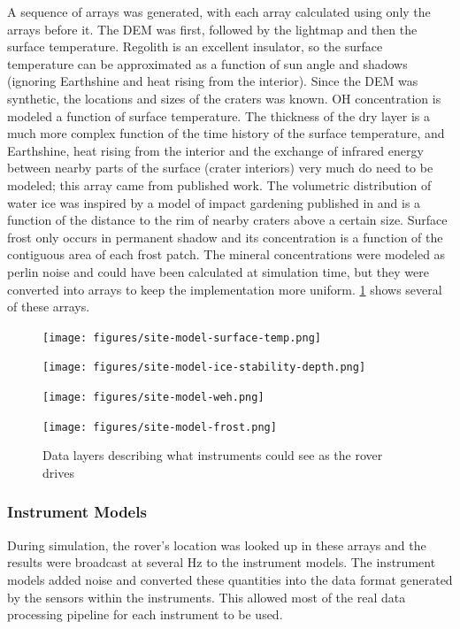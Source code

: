 \documentclass[twocolumn,letterpaper]{IEEEAerospaceCLS}  %
\begin{document}
A sequence of arrays was generated, with each array calculated using only the arrays before it.  
The DEM was first, followed by the lightmap and then the surface temperature.  
Regolith is an excellent insulator, so the surface temperature can be approximated as a function of sun angle and shadows (ignoring Earthshine and heat rising from the interior).  
Since the DEM was synthetic, the locations and sizes of the craters was known.  
OH concentration is modeled a function of surface temperature.  
The thickness of the dry layer is a much more complex function of the time history of the surface temperature, and Earthshine, heat rising from the interior and the exchange of infrared energy between nearby parts of the surface (crater interiors) very much do need to be modeled; this array came from published work\cite{siegler2015}. 
The volumetric distribution of water ice was inspired by a model of impact gardening published in \cite{hurley2012} and is a function of the distance to the rim of nearby craters above a certain size.  
Surface frost only occurs in permanent shadow and its concentration is a function of the contiguous area of each frost patch.  
The mineral concentrations were modeled as perlin noise and could have been calculated at simulation time, but they were converted into arrays to keep the implementation more uniform.  
\cref{fig:data-layers} shows several of these arrays.

\begin{figure}[htp]
\begin{subfloat}{
\texttt{[image: figures/site-model-surface-temp.png]}
}
\end{subfloat}
\qquad
\begin{subfloat}{
\texttt{[image: figures/site-model-ice-stability-depth.png]}
}
\end{subfloat}
\qquad
\begin{subfloat}{
\texttt{[image: figures/site-model-weh.png]}
}
\end{subfloat}
\qquad
\begin{subfloat}{
\texttt{[image: figures/site-model-frost.png]}
}
\end{subfloat}
\caption{Data layers describing what instruments could see as the rover drives
\label{fig:data-layers}}
\end{figure}

\subsubsection{Instrument Models}
During simulation, the rover's location was looked up in these arrays and the results were broadcast at several Hz to the instrument models.  
The instrument models added noise and converted these quantities into the data format generated by the sensors within the instruments.  
This allowed most of the real data processing pipeline for each instrument to be used.
\end{document}
